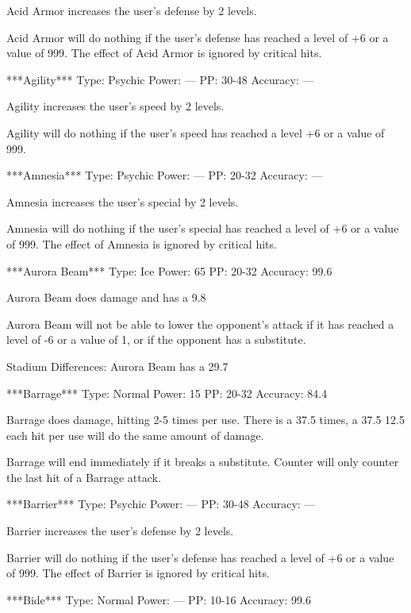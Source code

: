 \documentclass[reprint, aps, prl, paper=A4]{revtex4-1}
\begin{document}
Acid Armor increases the user's defense by 2 levels.

Acid Armor will do nothing if the user's defense has reached a level of +6 or a value of 999.
The effect of Acid Armor is ignored by critical hits.


***Agility***
Type: Psychic
Power: ---
PP: 30-48
Accuracy: ---

Agility increases the user's speed by 2 levels.

Agility will do nothing if the user's speed has reached a level +6 or a value of 999.


***Amnesia***
Type: Psychic
Power: ---
PP: 20-32
Accuracy: ---

Amnesia increases the user's special by 2 levels.

Amnesia will do nothing if the user's special has reached a level of +6 or a value of 999. The
effect of Amnesia is ignored by critical hits.


***Aurora Beam***
Type: Ice
Power: 65
PP: 20-32
Accuracy: 99.6%

Aurora Beam does damage and has a 9.8%

Aurora Beam will not be able to lower the opponent's attack if it has reached a level of -6 or
a value of 1, or if the opponent has a substitute.

Stadium Differences:
Aurora Beam has a 29.7%


***Barrage***
Type: Normal
Power: 15
PP: 20-32
Accuracy: 84.4%

Barrage does damage, hitting 2-5 times per use. There is a 37.5%
times, a 37.5%
12.5%
each hit per use will do the same amount of damage.

Barrage will end immediately if it breaks a substitute. Counter will only counter the last hit
of a Barrage attack.


***Barrier***
Type: Psychic
Power: ---
PP: 30-48
Accuracy: ---

Barrier increases the user's defense by 2 levels.

Barrier will do nothing if the user's defense has reached a level of +6 or a value of 999. The
effect of Barrier is ignored by critical hits.


***Bide***
Type: Normal
Power: ---
PP: 10-16
Accuracy: 99.6%
\end{document}
